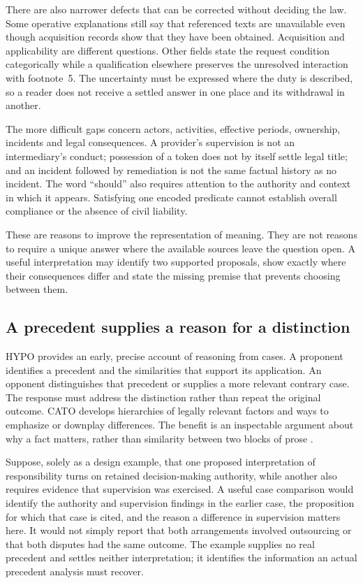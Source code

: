 There are also narrower defects that can be corrected without deciding the
law. Some operative explanations still say that referenced texts are
unavailable even though acquisition records show that they have been
obtained. Acquisition and applicability are different questions. Other fields
state the request condition categorically while a qualification elsewhere
preserves the unresolved interaction with footnote~5. The uncertainty must be
expressed where the duty is described, so a reader does not receive a settled
answer in one place and its withdrawal in another.

The more difficult gaps concern actors, activities, effective periods,
ownership, incidents and legal consequences. A provider's supervision is not
an intermediary's conduct; possession of a token does not by itself settle
legal title; and an incident followed by remediation is not the same factual
history as no incident. The word “should” also requires attention to the
authority and context in which it appears. Satisfying one encoded predicate
cannot establish overall compliance or the absence of civil liability.

These are reasons to improve the representation of meaning. They are not
reasons to require a unique answer where the available sources leave the
question open. A useful interpretation may identify two supported proposals,
show exactly where their consequences differ and state the missing premise
that prevents choosing between them.

\subsection{A precedent supplies a reason for a distinction}

HYPO provides an early, precise account of reasoning from cases. A proponent
identifies a precedent and the similarities that support its application. An
opponent distinguishes that precedent or supplies a more relevant contrary
case. The response must address the distinction rather than repeat the
original outcome. CATO develops hierarchies of legally relevant factors and
ways to emphasize or downplay differences. The benefit is an inspectable
argument about why a fact matters, rather than similarity between two blocks
of prose \citep[secs.~2--3]{hypolegacy2017}.

Suppose, solely as a design example, that one proposed interpretation of
responsibility turns on retained decision-making authority, while another
also requires evidence that supervision was exercised. A useful case
comparison would identify the authority and supervision findings in the
earlier case, the proposition for which that case is cited, and the reason a
difference in supervision matters here. It would not simply report that both
arrangements involved outsourcing or that both disputes had the same outcome.
The example supplies no real precedent and settles neither interpretation;
it identifies the information an actual precedent analysis must recover.

